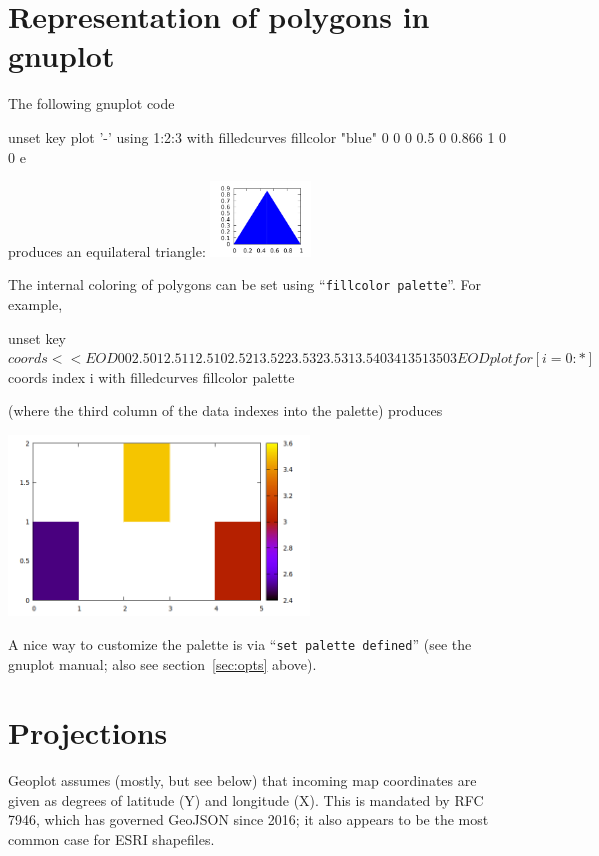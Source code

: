 \documentclass{article}
\newcommand{\startappendices}{%
\newcounter{appcount}
\setcounter{appcount}{0}
\renewcommand{\thesection}{Appendix \Alph{appcount}}}
\newcommand{\myappendix}[1]{%
\addtocounter{appcount}{1}
\section{#1}}
\begin{document}
\clearpage
\startappendices

\myappendix{Representation of polygons in gnuplot}
\label{sec:gnuplot}

The
following \textsf{gnuplot} code
\begin{code}
  unset key
  plot '-' using 1:2:3 with filledcurves fillcolor "blue"
  0 0 0
  0.5 0 0.866
  1 0 0
  e
\end{code}
produces an equilateral triangle: \includegraphics[height=2cm]{triangle.pdf}

\medskip

The internal coloring of polygons can be set using ``\texttt{fillcolor
  palette}''. For example,
\begin{code}
unset key
$coords << EOD
0 0 2.5
0 1 2.5
1 1 2.5
1 0 2.5

2 1 3.5
2 2 3.5
3 2 3.5
3 1 3.5

4 0 3
4 1 3
5 1 3
5 0 3
EOD
plot for [i=0:*] $coords index i with filledcurves fillcolor palette
\end{code}
(where the third column of the data indexes into the palette) produces
\begin{center}
  \includegraphics[width=0.6\textwidth]{squares}
\end{center}

A nice way to customize the palette is via ``\texttt{set
  palette defined}'' (see the \textsf{gnuplot} manual; also see
section~\ref{sec:opts} above).

\clearpage
\myappendix{Projections}
\label{app:proj}

\textsf{Geoplot} assumes (mostly, but see below) that incoming map
coordinates are given as degrees of latitude (Y) and longitude
(X). This is mandated by RFC 7946, which has governed GeoJSON since
2016; it also appears to be the most common case for ESRI shapefiles.
\end{document}
